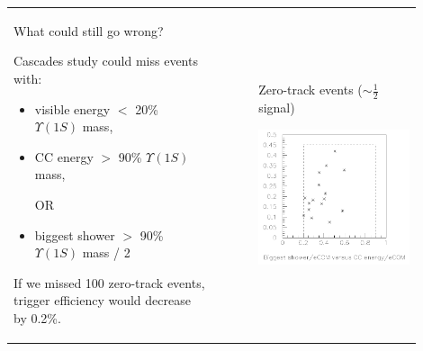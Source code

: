 \documentclass[landscape]{article}
\begin{document}
\begin{tabular}{p{0.5\linewidth} c p{0.4\linewidth}}
  \begin{minipage}{\linewidth}
    What could still go wrong?

    \bigskip
    
    Cascades study could miss events with:

    \begin{itemize}

      \item visible energy $<$ 20\% $\Upsilon(1S)$ mass,

      \item CC energy $>$ 90\% $\Upsilon(1S)$ mass,

\begin{center} OR \end{center}

      \item biggest shower $>$ 90\% $\Upsilon(1S)$ mass / 2

    \end{itemize}

    \bigskip

    If we missed 100 zero-track events, trigger efficiency would
    decrease by 0.2\%.

  \end{minipage} & \mbox{\hspace{0.5 cm}} &
  \begin{minipage}{\linewidth}
    \begin{center}
      Zero-track events ($\sim\frac{1}{2}$ signal)

      \medskip

      \mbox{\hspace{0.5 cm}} \includegraphics[width=0.9\linewidth]{cascade_still_missing3_tt.pdf}

    \end{center}
  \end{minipage}
\end{tabular}
\end{document}
